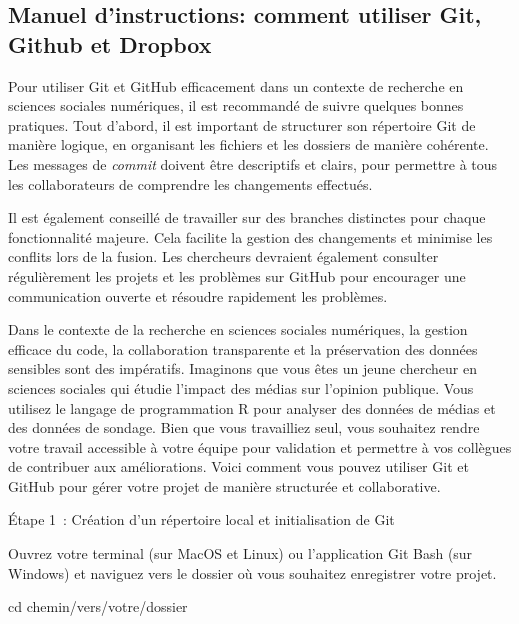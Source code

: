 \documentclass[
  letterpaper,
  DIV=11,
  numbers=noendperiod]{scrreprt}
\newenvironment{Shaded}{\begin{snugshade}}{\end{snugshade}}
\newcommand{\BuiltInTok}[1]{\textcolor[rgb]{0.00,0.23,0.31}{#1}}
\newcommand{\NormalTok}[1]{\textcolor[rgb]{0.00,0.23,0.31}{#1}}
\begin{document}
\subsection{Manuel d'instructions: comment utiliser Git, Github et
Dropbox}\label{manuel-dinstructions-comment-utiliser-git-github-et-dropbox}

Pour utiliser Git et GitHub efficacement dans un contexte de recherche
en sciences sociales numériques, il est recommandé de suivre quelques
bonnes pratiques. Tout d'abord, il est important de structurer son
répertoire Git de manière logique, en organisant les fichiers et les
dossiers de manière cohérente. Les messages de \emph{commit} doivent
être descriptifs et clairs, pour permettre à tous les collaborateurs de
comprendre les changements effectués.

Il est également conseillé de travailler sur des branches distinctes
pour chaque fonctionnalité majeure. Cela facilite la gestion des
changements et minimise les conflits lors de la fusion. Les chercheurs
devraient également consulter régulièrement les projets et les problèmes
sur GitHub pour encourager une communication ouverte et résoudre
rapidement les problèmes.

Dans le contexte de la recherche en sciences sociales numériques, la
gestion efficace du code, la collaboration transparente et la
préservation des données sensibles sont des impératifs. Imaginons que
vous êtes un jeune chercheur en sciences sociales qui étudie l'impact
des médias sur l'opinion publique. Vous utilisez le langage de
programmation R pour analyser des données de médias et des données de
sondage. Bien que vous travailliez seul, vous souhaitez rendre votre
travail accessible à votre équipe pour validation et permettre à vos
collègues de contribuer aux améliorations. Voici comment vous pouvez
utiliser Git et GitHub pour gérer votre projet de manière structurée et
collaborative.

Étape 1~: Création d'un répertoire local et initialisation de Git

Ouvrez votre terminal (sur MacOS et Linux) ou l'application Git Bash
(sur Windows) et naviguez vers le dossier où vous souhaitez enregistrer
votre projet.

\begin{Shaded}
\begin{Highlighting}[]
\BuiltInTok{cd}\NormalTok{ chemin/vers/votre/dossier}
\end{Highlighting}
\end{Shaded}
\end{document}

